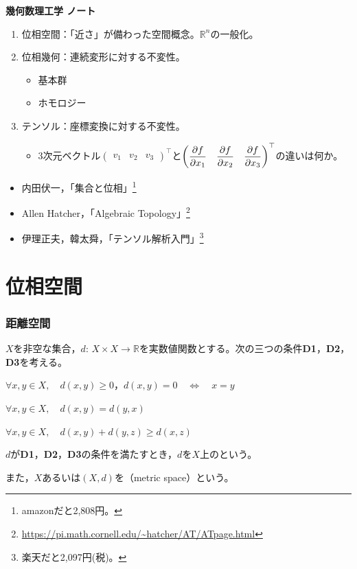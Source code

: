 \documentclass[uplatex]{jsarticle}
\newcommand{\octopuspart}[1]{\newpage\part{#1}\setcounter{section}{0}\vspace{3\baselineskip}}
\begin{document}
\begin{center}{\LARGE \bf 幾何数理工学 ノート}\end{center}

\begin{enumerate}
    \item 位相空間：「近さ」が備わった空間概念。$\mathbb{R}^{n}$の一般化。
    \item 位相幾何：連続変形に対する不変性。
    \begin{itemize}
        \item 基本群
        \item ホモロジー
    \end{itemize}
    \item テンソル：座標変換に対する不変性。
    \begin{itemize}
        \item 3次元ベクトル${\displaystyle \begin{pmatrix}
            v_{1} & v_{2} & v_{3} 
        \end{pmatrix}^{\top}}$と${\displaystyle \begin{pmatrix}
            \dfrac{\partial f}{\partial x_{1}} & \dfrac{\partial f}{\partial x_{2}} & \dfrac{\partial f}{\partial x_{3}}
        \end{pmatrix}^{\top}}$の違いは何か。
    \end{itemize}
\end{enumerate}

\begin{itemize}
    \item 内田伏一，「集合と位相」\footnote{amazonだと2,808円。}
    \item Allen Hatcher，「Algebraic Topology」\footnote{\url{https://pi.math.cornell.edu/~hatcher/AT/ATpage.html}}
    \item 伊理正夫，韓太舜，「テンソル解析入門」\footnote{楽天だと2,097円(税)。}
\end{itemize}

\renewcommand{\baselinestretch}{0.1}
\tableofcontents
\renewcommand{\baselinestretch}{1.0}

\octopuspart{位相空間}
\section{距離空間}

\begin{teigi}
    $X$を非空な集合，$d: \, X \times X \to \mathbb{R}$を実数値関数とする。次の三つの条件{\bf D1}，{\bf D2}，{\bf D3}を考える。
    
     $\forall x, y \in X, \quad d(x,y) \ge 0$，\qquad $d(x,y) = 0 \quad \Longleftrightarrow \quad x = y$
    
     $\forall x, y \in X, \quad d(x,y) = d(y,x)$
    
     $\forall x, y \in X, \quad d(x,y) + d(y,z) \ge d(x,z)$
    
    $d$が{\bf D1}，{\bf D2}，{\bf D3}の条件を満たすとき，$d$を$X$上のという。

    また，$X$あるいは$(X,d)$を（metric space）という。
\end{teigi}
\end{document}
